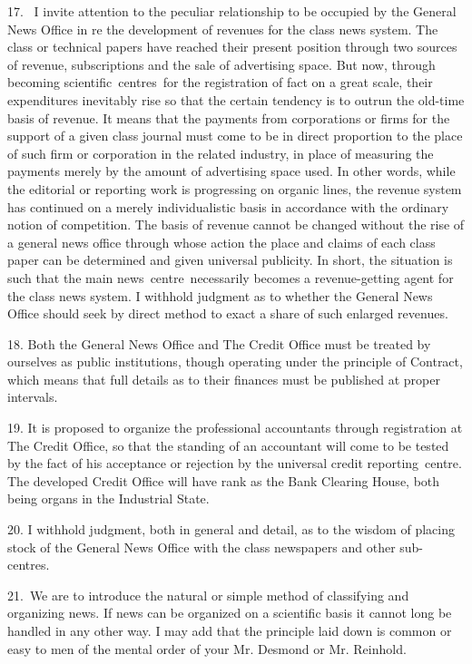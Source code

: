 \documentclass[openany,nobib]{tufte-book}
\begin{document}
17. ~I invite attention to the peculiar relationship to be occupied by
the General News Office in re the development of revenues for the class
news system. The class or technical papers have reached their present
position through two sources of revenue, subscriptions and the sale of
advertising space. But now, through becoming scientific~centres~for the
registration of fact on a great scale, their expenditures inevitably
rise so that the certain tendency is to outrun the old-time basis of
revenue. It means that the payments from corporations or firms for the
support of a given class journal must come to be in direct proportion to
the place of such firm or corporation in the related industry, in place
of measuring the payments merely by the amount of advertising space
used. In other words, while the editorial or reporting work is
progressing on organic lines, the revenue system has continued on a
merely individualistic basis in accordance with the ordinary notion of
competition. The basis of revenue cannot be changed without the rise of
a general news office through whose action the place and claims of each
class paper can be determined and given universal publicity. In short,
the situation is such that the main news~centre~necessarily becomes a
revenue-getting agent for the class news system. I withhold judgment as
to whether the General News Office should seek by direct method to exact
a share of such enlarged revenues.~

18. Both the General News Office and The Credit Office must be treated
by ourselves as public institutions, though operating under the
principle of Contract, which means that full details as to their
finances must be published at proper intervals.~

19. It is proposed to organize the professional accountants through
registration at The Credit Office, so that the standing of an accountant
will come to be tested by the fact of his acceptance or rejection by the
universal credit reporting~centre. The developed Credit Office will have
rank as the Bank Clearing House, both being organs in the Industrial
State.~

20. I withhold judgment, both in general and detail, as to the wisdom of
placing stock of the General News Office with the class newspapers and
other sub-centres.~

21.~We are to introduce the natural or simple method of classifying and
organizing news. If news can be organized on a scientific basis it
cannot long be handled in any other way. I may add that the principle
laid down is common or easy to men of the mental order of your Mr.
Desmond or Mr. Reinhold.
\end{document}
